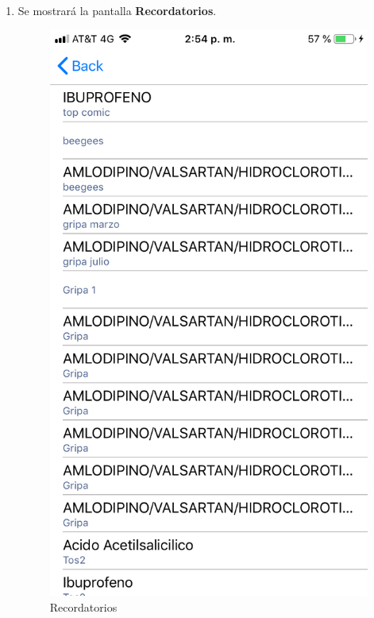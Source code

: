 \begin{enumerate}
	\item Se mostrará la pantalla \textbf{Recordatorios}. 
	\newpage
	\begin{figure}[!htbp]			
		\hypertarget{fig:Recordatorios}{\hspace{1pt}}
		\begin{center}
			\includegraphics[height=0.4\textheight]{Paciente/ConsultarRecordatorios/images/Recordatorios}
			\caption{Recordatorios}
			\label{fig:Recordatorios}
		\end{center}
	\end{figure}


\end{enumerate}

